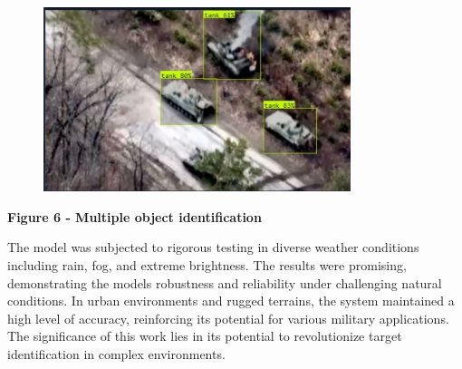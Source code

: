 \begin{figure}[H]
	\centering
	\includegraphics[width=0.8\textwidth]{assets/20}
	\caption*{}
\end{figure}

{\bfseries Figure 6 - Multiple object identification}

The model was subjected to rigorous testing in diverse weather
conditions including rain, fog, and extreme brightness. The results were
promising, demonstrating the model\textquotesingle s robustness and
reliability under challenging natural conditions. In urban environments
and rugged terrains, the system maintained a high level of accuracy,
reinforcing its potential for various military applications. The
significance of this work lies in its potential to revolutionize target
identification in complex environments.


